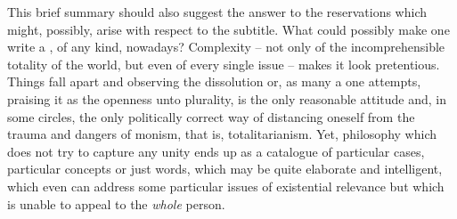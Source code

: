 \pan This brief summary should also suggest the answer to the reservations which
might, possibly, arise with respect to the subtitle.  What could possibly make
one write a , of any kind, nowadays?  Complexity -- not only of the
incomprehensible totality of the world, but even of every single issue -- makes
it look pretentious. Things fall apart and observing the dissolution or, as many
a one attempts, praising it as the openness unto plurality, is the only
reasonable attitude and, in some circles, the only politically correct way of
distancing oneself from the trauma and dangers of monism, that is,
totalitarianism.  Yet, philosophy which does not try to capture any unity ends
up as a catalogue of particular cases, particular concepts or just words, which
may be quite elaborate and intelligent, which even can address some particular
issues of existential relevance but which is unable to appeal to the {\em whole}
person.

